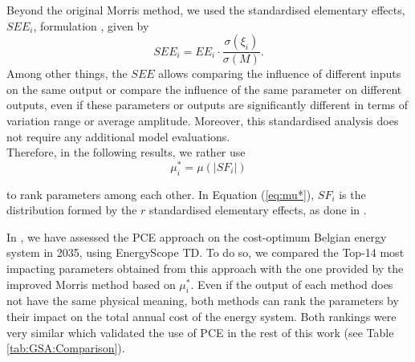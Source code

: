 Beyond the original Morris method, we used the standardised elementary effects, $SEE_{i}$, formulation \cite{Sin2009}, given by
\begin{equation}
    SEE_{i}=EE_{i}\cdot\frac{\sigma(\xi_i)}{\sigma(M)}.
\end{equation}
Among other things, the $SEE$ allows comparing the influence of different inputs on the same output or compare the influence of the same parameter on different outputs, even if these parameters or outputs are significantly different in terms of variation range or average amplitude. Moreover, this standardised analysis does not require any additional model evaluations.\\
Therefore, in the following results, we rather use
\begin{equation}
\mu^*_{i}=\mu(\vert SF_{i}\vert)
\label{eq:mu*}
\end{equation}

to rank parameters among each other. In Equation (\ref{eq:mu*}), $SF_{i}$ is the distribution formed by the $r$ standardised elementary effects, as done in \citet{Moret2017PhDThesis}.

In \cite{limpens2020impact}, we have assessed the \gls{PCE} approach on the cost-optimum Belgian energy system in 2035, using EnergyScope TD. To do so, we compared the Top-14 most impacting parameters obtained from this approach with the one provided by the improved Morris method based on $\mu^*_{i}$. Even if the output of each method does not have the same physical meaning, both methods can rank the parameters by their impact on the total annual cost of the energy system. Both rankings were very similar which validated the use of \gls{PCE} in the rest of this work (see Table \ref{tab:GSA:Comparison}).


